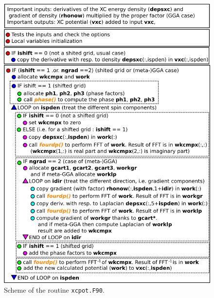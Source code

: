 \documentclass[a4paper,12pt]{report}
\begin{document}
\begin{figure}[!ht]
	\centering
	\includegraphics[width=\textwidth]{xcpot}
	\caption{Scheme of the routine \texttt{xcpot.F90}.}
	\label{figxcpot}
\end{figure}
\end{document}
